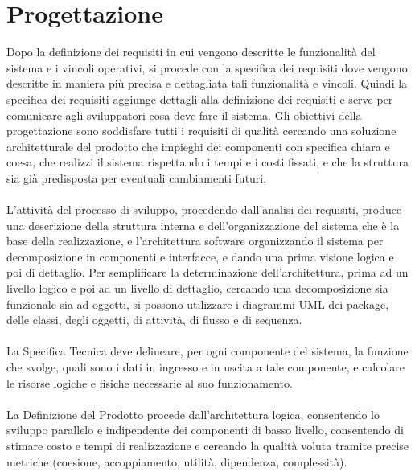 \section{Progettazione}
Dopo la definizione dei requisiti in cui vengono descritte le funzionalit\`a del
sistema e i vincoli operativi, si procede con la specifica dei requisiti dove
vengono descritte in maniera pi\`u precisa e dettagliata tali
funzionalit\`a e vincoli. Quindi la specifica dei requisiti aggiunge dettagli
alla definizione dei requisiti e serve per comunicare agli sviluppatori cosa
deve fare il sistema. 
Gli obiettivi della progettazione sono soddisfare tutti i requisiti di qualit\`a
cercando una soluzione architetturale del prodotto che impieghi dei componenti
con specifica chiara e coesa, che realizzi il sistema rispettando i tempi e i costi
fissati, e che la struttura sia gi\`a predisposta per eventuali cambiamenti
futuri. \\ \\
L'attivit\`a del processo di sviluppo, procedendo dall'analisi dei requisiti,
produce una descrizione della struttura interna e dell'organizzazione del sistema
che \`e la base della realizzazione, e l'architettura software organizzando il
sistema per decomposizione in componenti e interfacce, e dando una prima visione
logica e poi di dettaglio.
Per semplificare la determinazione dell'architettura, prima ad un
livello logico e poi ad un livello di dettaglio, cercando una decomposizione sia
funzionale sia ad oggetti, si possono utilizzare i diagrammi UML dei package,
delle classi, degli oggetti, di attivit\`a, di flusso e di sequenza. \\ \\
La Specifica Tecnica
deve delineare, per ogni componente del sistema, la funzione che svolge, quali
sono i dati in ingresso e in uscita a tale componente, e calcolare le risorse
logiche e fisiche necessarie al suo funzionamento.\\ \\
La Definizione del Prodotto procede dall'architettura logica, consentendo lo
sviluppo parallelo e indipendente dei componenti di basso livello, consentendo
di stimare costo e tempi di realizzazione e cercando la qualit\`a voluta tramite
precise metriche (coesione, accoppiamento, utilit\`a, dipendenza,
complessit\`a).

